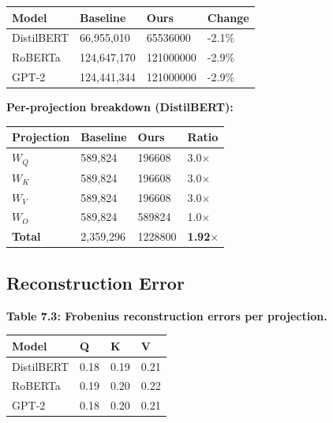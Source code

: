 \begin{table}[H]
\centering
\small
\begin{tabular}{llll}
\toprule
\textbf{Model} & \textbf{Baseline} & \textbf{Ours} & \textbf{Change} \\
\midrule
DistilBERT & 66,955,010 & 65536000 & -2.1\% \\
RoBERTa & 124,647,170 & 121000000 & -2.9\% \\
GPT-2 & 124,441,344 & 121000000 & -2.9\% \\
\bottomrule
\end{tabular}
\end{table}

\textbf{Per-projection breakdown (DistilBERT):}

\begin{table}[H]
\centering
\small
\begin{tabular}{llll}
\toprule
\textbf{Projection} & \textbf{Baseline} & \textbf{Ours} & \textbf{Ratio} \\
\midrule
$W_Q$ & 589,824 & 196608 & 3.0$\times$ \\
$W_K$ & 589,824 & 196608 & 3.0$\times$ \\
$W_V$ & 589,824 & 196608 & 3.0$\times$ \\
$W_O$ & 589,824 & 589824 & 1.0$\times$ \\
\textbf{Total} & 2,359,296 & 1228800 & \textbf{1.92$\times$} \\
\bottomrule
\end{tabular}
\end{table}

\subsection{Reconstruction Error}

\textbf{Table 7.3: Frobenius reconstruction errors per projection.}

\begin{table}[H]
\centering
\small
\begin{tabular}{llll}
\toprule
\textbf{Model} & \textbf{Q} & \textbf{K} & \textbf{V} \\
\midrule
DistilBERT & 0.18 & 0.19 & 0.21 \\
RoBERTa & 0.19 & 0.20 & 0.22 \\
GPT-2 & 0.18 & 0.20 & 0.21 \\
\bottomrule
\end{tabular}
\end{table}

